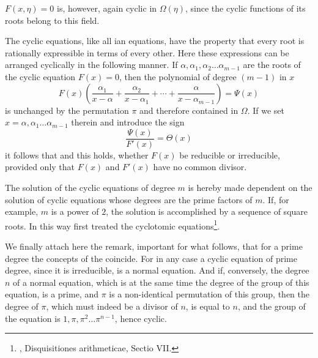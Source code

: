 
$F(x, \eta) = 0$ is, however, again cyclic in $\Omega(\eta)$, since the cyclic functions of its roots belong to this field.

The cyclic equations, like all ian equations, have the property that every root is rationally expressible in terms of every other. Here these expressions can be arranged cyclically in the following manner. If $\alpha, \alpha_1, \alpha_2 \ldots \alpha_{m-1}$ are the roots of the cyclic equation $F(x) = 0$, then the polynomial of degree $(m-1)$ in $x$
\[
F(x)\left(\frac{\alpha_1}{x-\alpha} + \frac{\alpha_2}{x-\alpha_1} + \cdots + \frac{\alpha}{x-\alpha_{m-1}}\right) = \Psi(x)
\]
is unchanged by the permutation $\pi$ and therefore contained in $\Omega$. If we set $x = \alpha, \alpha_1 \ldots \alpha_{m-1}$ therein and introduce the sign
\[
\frac{\Psi(x)}{F'(x)} = \Theta(x)
\]
it follows that
and this holds, whether $F(x)$ be reducible or irreducible, provided only that $F(x)$ and $F'(x)$ have no common divisor.

The solution of the cyclic equations of degree $m$ is hereby made dependent on the solution of cyclic equations whose degrees are the prime factors of $m$. If, for example, $m$ is a power of $2$, the solution is accomplished by a sequence of square roots. In this way  first treated the cyclotomic equations\footnote{, Disquisitiones arithmeticae, Sectio VII.}.

We finally attach here the remark, important for what follows, that for a prime degree the concepts of the  coincide. For in any case a cyclic equation of prime degree, since it is irreducible, is a normal equation. And if, conversely, the degree $n$ of a normal equation, which is at the same time the degree of the group of this equation, is a prime, and $\pi$ is a non-identical permutation of this group, then the degree of $\pi$, which must indeed be a divisor of $n$, is equal to $n$, and the group of the equation is $1, \pi, \pi^2 \ldots \pi^{n-1}$, hence cyclic.
